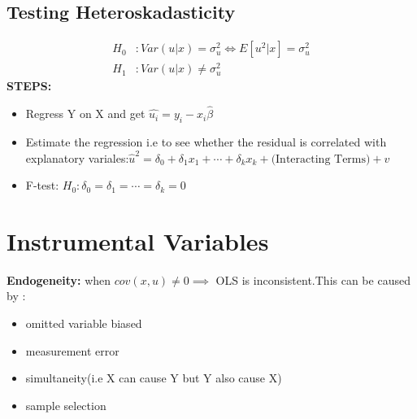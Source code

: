 \documentclass{article}
\theoremstyle{definition}
\theoremstyle{thrm}
\theoremstyle{lma}
\theoremstyle{ppst}
\theoremstyle{crlr}
\begin{document}
\subsection{Testing Heteroskadasticity}
\begin{align*}
	H_0&:Var(u|x) = \sigma_{u}^2\iff E[u^2|x] = \sigma_{u}^2\\
	H_1 &: Var(u|x) \neq \sigma_{u}^2 
\end{align*}
\textbf{STEPS:}
\begin{itemize}
	\item Regress Y on X and get $\hat{u_i} = y_i-x_i\hat{\beta}$
	\item Estimate the regression i.e to see whether the residual is correlated with explanatory variales:$\hat{u}^2 = \delta_0+\delta_1x_1+\cdots+\delta_kx_k+\text{(Interacting Terms)}+ v$
	\item F-test: $H_0: \delta_0=\delta_1=\cdots=\delta_k=0$
\end{itemize}

\section{Instrumental Variables}
\textbf{Endogeneity: }when $cov(x,u)\neq 0\implies $ OLS is inconsistent.This can be caused by :
\begin{itemize}
	\item omitted variable biased
	\item measurement error
	\item simultaneity(i.e X can cause Y but Y also cause X)
	\item sample selection
\end{itemize}
\end{document}
